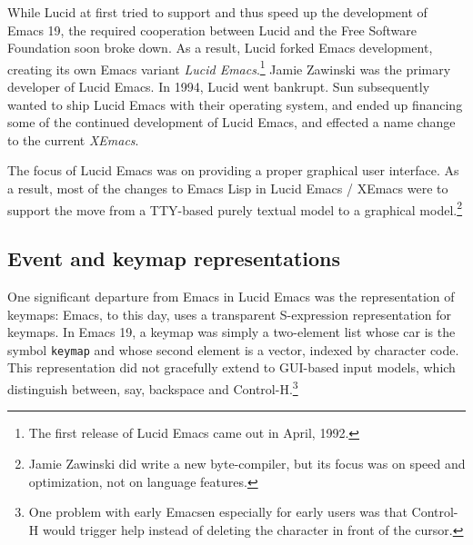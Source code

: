 \documentclass[format=acmsmall, review=false, screen=true]{acmart}
\begin{document}
While Lucid at first tried to support and thus speed up the
development of Emacs 19, the required cooperation between Lucid and
the Free Software Foundation soon broke down.  As a result, Lucid
forked Emacs development, creating its own Emacs variant \textit{Lucid
Emacs}.\footnote{The first release of Lucid Emacs came out in April,
1992.}  Jamie Zawinski was the primary developer of Lucid Emacs.
In 1994, Lucid went bankrupt.  Sun subsequently wanted to ship
Lucid Emacs with their operating system, and ended up financing some
of the continued development of Lucid Emacs, and effected a name
change to the current \textit{XEmacs}.

The focus of Lucid Emacs was on providing a proper graphical user
interface.  As a result, most of the changes to Emacs Lisp in Lucid
Emacs / XEmacs were to support the move from a TTY-based purely
textual model to a graphical model.\footnote{Jamie Zawinski did write a new
  byte-compiler, but its focus was on speed and optimization, not on
  language features.}

\subsection{Event and keymap representations}

One significant departure from Emacs in Lucid Emacs was the
representation of keymaps: Emacs, to this day, uses a transparent
S-expression representation for keymaps.
In Emacs 19, a keymap was
simply a two-element list whose car is the symbol \texttt{keymap} and
whose second element is a vector, indexed by character code.
This
representation did not gracefully extend to GUI-based input models,
which distinguish between, say, backspace and Control-H.\footnote{One
  problem with early Emacsen especially for early users was that
  Control-H would trigger help instead of deleting the character in
  front of the cursor.}
\end{document}
